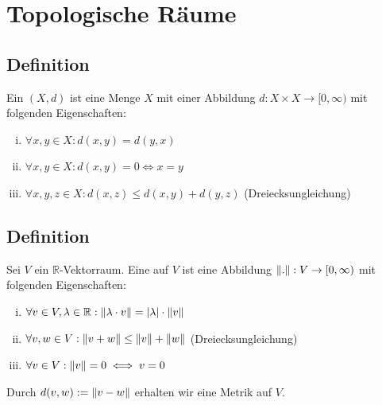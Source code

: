 
\newcommand{\fach}{Grundlagen der Analysis, Topologie, Geometrie}
\newcommand{\shortFach}{Analysis, Topologie, Geometrie}
\newcommand{\semester}{SoSe 2014}
\newcommand{\homepage}{https://wwwmath.uni-muenster.de/reine/u/topos/lehre/SS2014/AnaTopGeo/anatopgeo.html}

\newcommand{\prof}{Prof.\,Dr.\,Arthur Bartels}



\maketitle
{}
\begin{abstract}

\end{abstract}
\tableofcontents
\cleardoubleoddemptypage

\setcounter{page}{1}

\section{Topologische Räume} %
\label{sec:1}

\subsection[Definition: Metrischer Raum]{Definition} %
\label{sub:11}
Ein  $(X,d)$ ist eine Menge $X$ mit einer Abbildung $d: X \times X \to [0,\infty)$ mit folgenden Eigenschaften:
\begin{enumerate}[(i)]
	\item $\forall x,y \in X : d(x,y) = d(y,x) $
	\item $\forall x,y \in X : d(x,y)=0 \iff x=y$
	\item $\forall x,y,z \in X : d(x,z) \le d(x,y) + d(y,z)$ \hfill (Dreiecksungleichung)
\end{enumerate}

\subsection[Definition: Norm auf einem $\mathds{R}$-Vektorraum]{Definition} %
\label{sub:12}
Sei $V$ ein $\mathds{R}$-Vektorraum. Eine  auf $V$ ist eine Abbildung $\norm{.} : V \to [0,\infty)$ mit folgenden Eigenschaften:
\begin{enumerate}[(i)]
	\item $\forall v \in V, \lambda  \in \mathds{R} : \norm{\lambda  \cdot v} = \abs{\lambda}  \cdot \norm{v}  $
	\item $\forall v,w \in V : \norm{v+w} \le \norm{v} + \norm{w} $ \hfill (Dreiecksungleichung)
	\item $\forall v \in V : \norm{v} = 0 \iff v=0$
\end{enumerate} 
Durch $d(v,w) := \norm{v-w} $ erhalten wir eine Metrik auf $V$.

